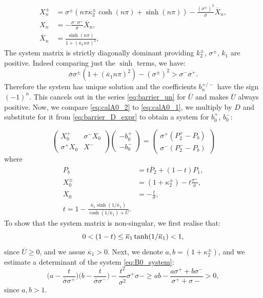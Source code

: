 \documentclass[sn-mathphys,Numbered]{sn-jnl}
\def\ol#1{\overline{#1}}
\begin{document}
\begin{align}
    \label{eq:yn}    
    X_n^\pm  &= \sigma^\pm(n \pi \kappa_2^\pm\cosh(n \pi) 
              + \sinh(n \pi))  -  \frac{(\sigma^\pm)^2}{\ol\sigma} \ol{X}_n, \\    
    X_n  &= -\frac{\sigma^- \sigma^+}{\ol\sigma} \ol{X}_n, \\    
    \ol{X}_n &= \frac{\sinh(n \pi)}{1 + (\ol{\kappa}_1 n \pi)^2},
\end{align}
The system matrix is strictly diagonally dominant providing $k_2^{\pm}$, $\sigma^{\pm}$, $k_1$ are positive. Indeed comparing just the $\sinh$ terms, we have:
\[
 {\ol\sigma}\sigma^\pm (1 + (\ol{\kappa}_1 n \pi)^2)  - (\sigma^\pm)^2 
 > \sigma^- \sigma^+.
\]
%
Therefore the system has unique solution and the coefficients $b_n^{+/-}$ have the sign $(-1)^n$. This cancels out in the series \eqref{eq:barrier_un} for  $\ol{U}$ and makes $\ol{U}$ always positive.
%
Now, we compare \eqref{eq:calA0_2} to \eqref{eq:calA0_1}, we multiply by $D$ and substitute for it from  \eqref{eq:barrier_D_expr} to 
obtain a system for $b_0^+$, $b_0^-$:

\begin{equation}
    \label{eq:B0_system}
    \begin{pmatrix} 
            X^+_0 & \sigma^- X_0 \\ 
            \sigma^+ X_0 & X^-
    \end{pmatrix}
    \begin{pmatrix} 
        -b_0^+  \\ 
        -b_0^-     
    \end{pmatrix}
     =  
    \begin{pmatrix} 
        \sigma^+(P^+_2 - P_b) \\ 
        \sigma^-(P^-_2 - P_b)
    \end{pmatrix}
\end{equation}
where
\begin{align}
    P_b &= t \ol{P}_2 + (1-t) P_1, \\
    X_0^\pm &= (1+\kappa_2^\pm)  -t\frac{\sigma^+}{\ol{\sigma}}, \\
    X_0 &= -\frac{t}{\ol{\sigma}},\\
    t=1- \frac{\ol{\kappa}_1\sinh( 1/\ol{\kappa}_1 )}{\cosh(1/\ol{\kappa}_1) + \ol{U}}.
\end{align}
To show that the system matrix is non-singular, we first realise that:
\[
    0 < (1-t) \le \ol{\kappa}_1\, {\rm tanh}( 1/\ol{\kappa}_1 ) < 1,
\]
since $\ol{U}\ge0$, and we assue $\ol{\kappa}_1 > 0$. Next, we denote 
$a, b = (1+\kappa_2^\pm)$, and we estimate a determinant of the system 
\eqref{eq:B0_system}:
\[
  \Big(  a  -\frac{t}{\ol{\sigma}\sigma^+}\Big)
  \Big(b  -\frac{t}{\ol{\sigma}\sigma^-}\Big) - \frac{t^2}{\ol{
  \sigma^2}}\sigma^+\sigma- \ge ab - \frac{a\sigma^+ +b\sigma^-}{\sigma^+ +\sigma-} > 0,
\]
since $a, b > 1$. 
\end{document}
